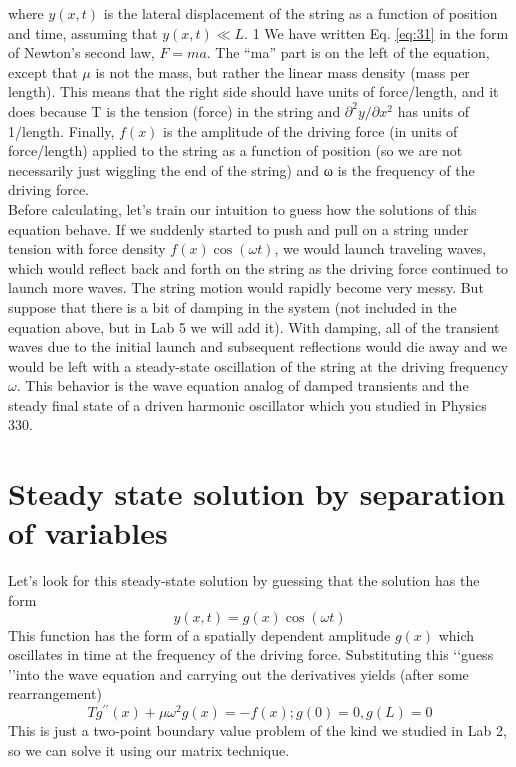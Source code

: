 		where $y(x,t)$ is the lateral displacement of the string as a function of position
and time, assuming that $y(x,t) ≪ L.$
1 We have written Eq. \eqref{eq:31} in the form of
Newton\rq s second law, $F = ma$. The “ma” part is on the left of the equation, except
that $\mu$ is not the mass, but rather the linear mass density (mass per length). This
means that the right side should have units of force/length, and it does because
T is the tension (force) in the string and $\partial^2y / \partial x^2$
 has units of 1/length. Finally,
$f (x)$ is the amplitude of the driving force (in units of force/length) applied to the
string as a function of position (so we are not necessarily just wiggling the end of
the string) and ω is the frequency of the driving force. \\
Before calculating, let\rq s train our intuition to guess how the solutions of this
equation behave. If we suddenly started to push and pull on a string under tension
with force density $f(x)\cos(\omega t)$, we would launch traveling waves, which would
reflect back and forth on the string as the driving force continued to launch more
waves. The string motion would rapidly become very messy. But suppose that
there is a bit of damping in the system (not included in the equation above, but in
Lab 5 we will add it). With damping, all of the transient waves due to the initial
launch and subsequent reflections would die away and we would be left with a
steady-state oscillation of the string at the driving frequency $\omega$. This behavior is
the wave equation analog of damped transients and the steady final state of a
driven harmonic oscillator which you studied in Physics 330.		

\section*{Steady state solution by separation of variables}
Let\rq s look for this steady-state solution by guessing that the solution has the form
\begin{equation}\label{eq:32}
		y(x,t) = g(x)\cos(\omega t)
				\end{equation}
				This function has the form of a spatially dependent amplitude $g (x)$ which oscillates in time at the frequency of the driving force. Substituting this \lq\lq guess \rq\rq into the
wave equation and carrying out the derivatives yields (after some rearrangement)
\begin{equation}\label{eq:33}
		Tg^{\prime\prime}(x) + \mu \omega ^ 2 g(x) = -f(x) ; g(0) = 0, g(L) = 0
				\end{equation}
				This is just a two-point boundary value problem of the kind we studied in Lab 2,
so we can solve it using our matrix technique.
